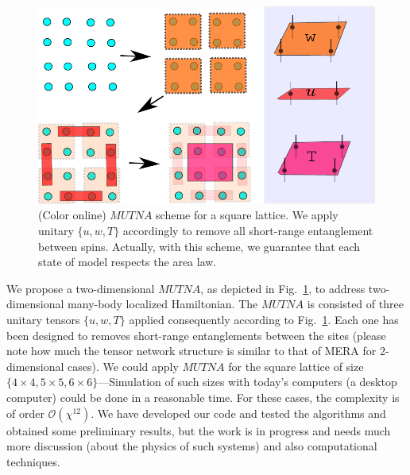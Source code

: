 \documentclass[aps,prb,twocolumn,groupedaddress,notitlepage,showpacs,floatfix,superscriptaddress]{revtex4-1}
\begin{document}
\begin{figure}[t]
\includegraphics[width=1.0 \linewidth, left]{MERA2D} 
  \caption{(Color online) $MUTNA$ scheme for a square lattice. We apply unitary $\{u, w, T\}$ accordingly to remove all short-range entanglement between spins. Actually, with this scheme, we guarantee that each state of model respects the area law.}
  \label{fig:MERA2D}
\end{figure}
 

We propose a two-dimensional $MUTNA$, as depicted in Fig.~\ref{fig:MERA2D}, to address two-dimensional many-body localized Hamiltonian. The $MUTNA$ is consisted of three unitary tensors $\{u, w, T\}$ applied consequently according to Fig.~\ref{fig:MERA2D}. Each one has been designed to removes short-range entanglements between the sites (please note how much the tensor network structure is similar to that of MERA for 2-dimensional cases). We could apply $MUTNA$ for the square lattice of size $\{4\times4,5\times5,6\times6\}$---Simulation of such sizes with today's computers (a desktop computer) could be done in a reasonable time. For these cases, the complexity is of order $\mathcal{O}(\chi^{12})$. We have developed our code and tested the algorithms and obtained some preliminary results, but the work is in progress and needs much more discussion (about the physics of such systems) and also computational techniques.

        
 
 
\end{document}
